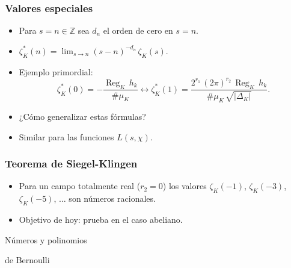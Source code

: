 \documentclass{beamer}
\newcommand{\ZZ}{\mathbb{Z}}
\DeclareMathOperator{\Reg}{Reg}
\begin{document}
\begin{frame}
  \frametitle{Valores especiales}

  \begin{itemize}
  \item<1-> Para $s = n \in \ZZ$ sea $d_n$ el orden de cero en $s = n$.

  \item<2-> $\zeta_K^* (n) = \lim_{s \to n} (s-n)^{-d_n}\,\zeta_K (s)$.

  \item<3-> Ejemplo primordial:
    \[ \zeta_K^* (0) = -\frac{\Reg_K\,h_k}{\# \mu_K}
      \longleftrightarrow
      \zeta_K^* (1) = \frac{2^{r_1}\,(2\pi)^{r_2}\,\Reg_K\,h_k}{\#\mu_K\,\sqrt{|\Delta_K|}}. \]

  \item<4-> ¿Cómo generalizar estas fórmulas?

  \item<5-> Similar para las funciones $L (s,\chi)$.
  \end{itemize}
\end{frame}


\begin{frame}
  \frametitle{Teorema de Siegel-Klingen}

  \begin{itemize}
  \item<1-> Para un campo totalmente real ($r_2 = 0$) los valores
    $\zeta_K (-1)$, $\zeta_K (-3)$, $\zeta_K (-5)$, $\ldots$ son números racionales.

  \item<2-> Objetivo de hoy: prueba en el caso abeliano.
  \end{itemize}
\end{frame}


\begin{frame}[plain]
  \headingfont

  \begin{center}
    {\huge Números y polinomios

      de Bernoulli

    }
  \end{center}
\end{frame}

\end{document}
